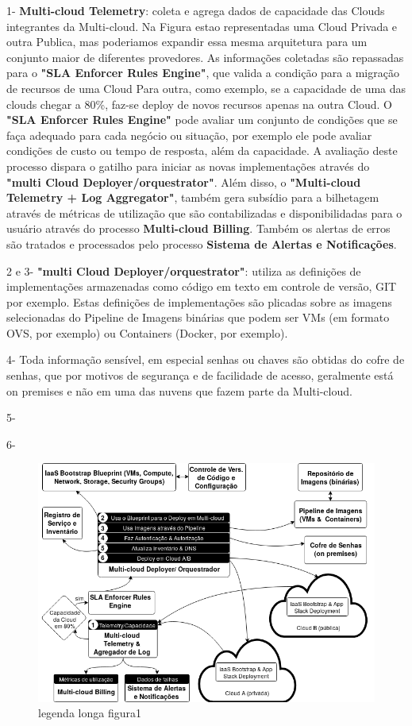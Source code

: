 \documentclass[12pt]{article}
\begin{document}
	1- \textbf{Multi-cloud Telemetry}: coleta e agrega dados de capacidade das Clouds integrantes da Multi-cloud. Na Figura estao representadas uma Cloud Privada e outra Publica, mas poderiamos expandir essa mesma arquitetura para um conjunto maior de diferentes provedores. As informações coletadas são repassadas para o \textbf{"SLA Enforcer Rules Engine"}, que valida a condição para a migração de recursos de uma Cloud Para outra, como exemplo, se a capacidade de uma das clouds chegar a 80\%, faz-se deploy de novos recursos apenas na outra Cloud. O \textbf{"SLA Enforcer Rules Engine"} pode avaliar um conjunto de condições que se faça adequado para cada negócio ou situação, por exemplo ele pode avaliar condições de custo ou tempo de resposta, além da capacidade. A avaliação deste processo dispara o gatilho para iniciar as novas implementações através do \textbf{"multi Cloud Deployer/orquestrator"}. Além disso, o \textbf{"Multi-cloud Telemetry + Log Aggregator"}, também gera subsídio para a bilhetagem através de métricas de utilização que são contabilizadas e disponibilidadas para o usuário através do processo \textbf{Multi-cloud Billing}. Também os alertas de erros são tratados e processados pelo processo \textbf{Sistema de Alertas e Notificações}.
	
	2 e 3- \textbf{"multi Cloud Deployer/orquestrator"}: utiliza as definições de implementações armazenadas como código em texto em controle de versão, GIT por exemplo. Estas definições de implementações são plicadas sobre as imagens selecionadas do Pipeline de Imagens binárias que podem ser VMs (em formato OVS, por exemplo) ou Containers (Docker, por exemplo).
	
	4- Toda informação sensível, em especial senhas ou chaves são obtidas do cofre de senhas, que por motivos de segurança e de facilidade de acesso, geralmente está on premises e não em uma das nuvens que fazem parte da Multi-cloud.   
	
	5- 
	
	6- 
	
		\begin{figure}[H]
			\centering
			\includegraphics[width=0.9\linewidth]{figuras/Figure1.png}
			\caption{legenda longa figura1}
			\label{fig:figure1}
		\end{figure}
\end{document}
